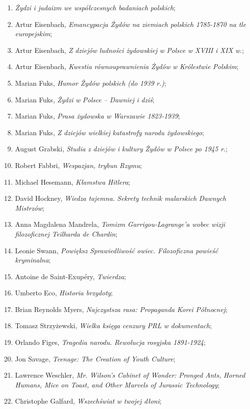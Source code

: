 \documentclass[a4paper,11pt]{article}
\begin{document}
\begin{enumerate}
\item \emph{Żydzi i judaizm we współczesnych badaniach polskich};
\item Artur Eisenbach, \emph{Emancypacja Żydów na ziemiach polskich
    1785-1870 na tle europejskim};
\item Artur Eisenbach, \emph{Z dziejów ludności żydowskiej w Polsce w
    XVIII i XIX w.};
\item Artur Eisenbach, \emph{Kwestia równouprawnienia Żydów w
    Królestwie Polskim};
\item Marian Fuks, \emph{Humor Żydów polskich (do 1939 r.)};
\item Marian Fuks, \emph{Żydzi w Polsce – Dawniej i dziś};
\item Marian Fuks, \emph{Prasa żydowska w Warszawie 1823-1939};
\item Marian Fuks, \emph{Z dziejów wielkiej katastrofy narodu
    żydowskiego};
\item August Grabski, \emph{Studia z dziejów i kultury Żydów w Polsce
    po 1945 r.};
\item Robert Fabbri, \emph{Wespazjan, trybun Rzymu};
\item Michael Hesemann, \emph{Kłamstwa Hitlera};
\item David Hockney, \emph{Wiedza tajemna. Sekrety technik malarskich
    Dawnych Mistrzów};
\item Anna Magdalena Mandrela, \emph{Tomizm Garrigou-Lagrange’a wobec
    wizji filozoficznej Teilharda de Chardin};
\item Leonie Swann, \emph{Powiększ Sprawiedliwość owiec. Filozoficzna
    powieść kryminalna};
\item Antoine de Saint-Exupéry, \emph{Twierdza};
\item Umberto Eco, \emph{Historia brzydoty};
\item Brian Reynolds Myers, \emph{Najczystsza rasa: Propaganda Korei
    Północnej};
\item Tomasz Strzyżewski, \emph{Wielka księga cenzury PRL w
    dokumentach};
\item Orlando Figes, \emph{Tragedia narodu. Rewolucja rosyjska
    1891-1924};
\item Jon Savage, \emph{Teenage: The Creation of Youth Culture};
\item Lawrence Weschler, \emph{Mr. Wilson's Cabinet of Wonder: Pronged
    Ants, Horned Humans, Mice on Toast, and Other Marvels of Jurassic
    Technology};
\item Christophe Galfard, \emph{Wszechświat w twojej dłoni};

\end{enumerate}
\end{document}
